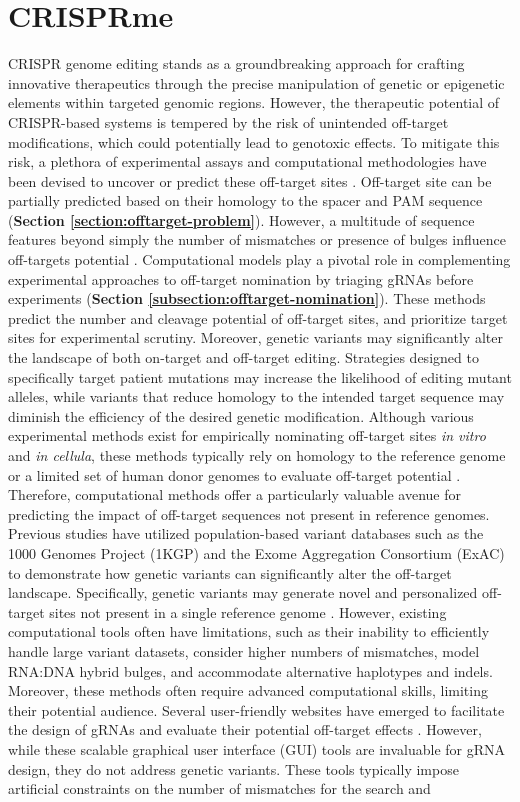 \documentclass[a4paper, titlepage, openright]{book}
\newcommand{\mychapter}[2]{
    \setcounter{chapter}{#1}
    \setcounter{section}{0}
    \chapter*{#2}
    \addcontentsline{toc}{chapter}{#2}
}
\begin{document}
\mychapter{9}{CRISPRme}
CRISPR genome editing stands as a groundbreaking approach for crafting innovative therapeutics through the precise manipulation of genetic or epigenetic elements within targeted genomic regions. However, the therapeutic potential of CRISPR-based systems is tempered by the risk of unintended off-target modifications, which could potentially lead to genotoxic effects. To mitigate this risk, a plethora of experimental assays and computational methodologies have been devised to uncover or predict these off-target sites \citep{clement2020technologies}. Off-target site can be partially predicted based on their homology to the spacer and PAM sequence (\textbf{Section \ref{section:offtarget-problem}}). However, a multitude of sequence features beyond simply the number of mismatches or presence of bulges influence off-targets potential \citep{clement2020technologies, bao2021tools, hsu2013dna, doench2016optimized}. Computational models play a pivotal role in complementing experimental approaches to off-target nomination by triaging gRNAs before experiments (\textbf{Section \ref{subsection:offtarget-nomination}}). These methods predict the number and cleavage potential of off-target sites, and prioritize target sites for experimental scrutiny. Moreover, genetic variants may significantly alter the landscape of both on-target and off-target editing. Strategies designed to specifically target patient mutations may increase the likelihood of editing mutant alleles, while variants that reduce homology to the intended target sequence may diminish the efficiency of the desired genetic modification. Although various experimental methods exist for empirically nominating off-target sites \emph{in vitro} and \emph{in cellula}, these methods typically rely on homology to the reference genome or a limited set of human donor genomes to evaluate off-target potential \citep{bao2021tools, chaudhari2020evaluation}. Therefore, computational methods offer a particularly valuable avenue for predicting the impact of off-target sequences not present in reference genomes. Previous studies have utilized population-based variant databases such as the 1000 Genomes Project (1KGP) and the Exome Aggregation Consortium (ExAC) to demonstrate how genetic variants can significantly alter the off-target landscape. Specifically, genetic variants may generate novel and personalized off-target sites not present in a single reference genome \citep{lessard2017human, scott2017implications}. However, existing computational tools often have limitations, such as their inability to efficiently handle large variant datasets, consider higher numbers of mismatches, model RNA:DNA hybrid bulges, and accommodate alternative haplotypes and indels. Moreover, these methods often require advanced computational skills, limiting their potential audience. Several user-friendly websites have emerged to facilitate the design of gRNAs and evaluate their potential off-target effects \citep{concordet2018crispor, listgarten2018prediction, labun2019chopchop, park2015cas}. However, while these scalable graphical user interface (GUI) tools are invaluable for gRNA design, they do not address genetic variants. These tools typically impose artificial constraints on the number of mismatches for the search and 
\end{document}
